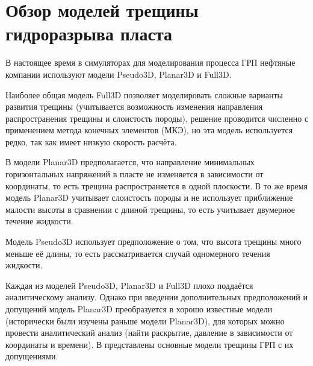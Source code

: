 \chapter{Обзор моделей трещины гидроразрыва пласта} \label{ch2}

В настоящее время в симуляторах для моделирования процесса ГРП нефтяные компании используют модели Pseudo3D, Planar3D и Full3D.

Наиболее общая модель Full3D позволяет моделировать сложные варианты развития трещины (учитывается возможность изменения направления распространения трещины и слоистость породы), решение проводится численно с применением метода конечных элементов (МКЭ), но эта модель используется редко, так как имеет низкую скорость расчёта.

В модели Planar3D предполагается, что направление минимальных горизонтальных напряжений в пласте не изменяется в зависимости от координаты, то есть трещина распространяется в одной плоскости.
В то же время модель Planar3D учитывает слоистость породы и не использует приближение малости высоты в сравнении с длиной трещины, то есть учитывает двумерное течение жидкости.

Модель Pseudo3D использует предположение о том, что высота трещины много меньше её длины, то есть рассматривается случай одномерного течения жидкости.

Каждая из моделей Pseudo3D, Planar3D и Full3D плохо поддаётся аналитическому анализу.
Однако при введении дополнительных предположений и допущений модель Planar3D преобразуется в хорошо известные модели (исторически были изучены раньше модели Planar3D), для которых можно провести аналитический анализ (найти раскрытие, давление в зависимости от координаты и времени).
В  представлены основные модели трещины ГРП с их допущениями.


